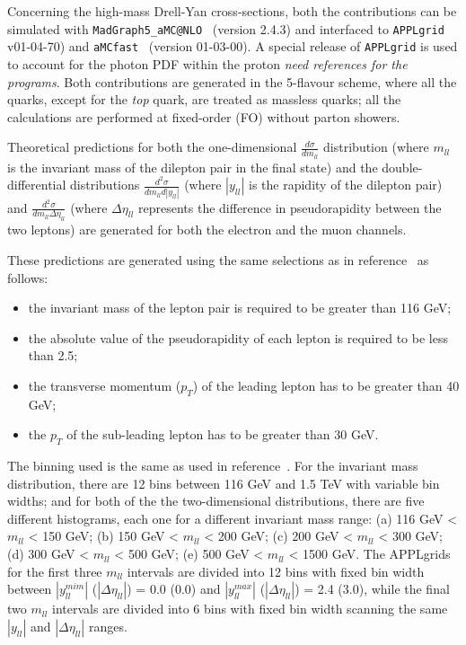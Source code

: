 Concerning the high-mass Drell-Yan cross-sections,
both the contributions can be 
simulated with {\tt MadGraph5{\_}aMC@NLO}~\cite{Alwall:2014hca}
(version 2.4.3) and interfaced to {\tt APPLgrid}~\cite{Carli:2010rw}
v01-04-70) and {\tt aMCfast}~\cite{Carli:2010rw} (version 01-03-00).
%
A special release of {\tt APPLgrid} is used to account for the photon PDF within the proton {\it need references for the programs}.
Both contributions are generated in the 5-flavour scheme, where all the quarks, except for the \textit{top}
 quark, are treated as massless quarks; all the calculations are performed at fixed-order (FO) without 
 parton showers.



Theoretical predictions for both the one-dimensional $\frac{d\sigma}{dm_{ll}}$ distribution 
(where $m_{ll}$ is the invariant mass of the dilepton pair in the final state) and the double-differential 
distributions $\frac{d^{2}\sigma}{dm_{ll}d|y_{ll}|}$ (where $|y_{ll}|$ is the rapidity of the dilepton pair) 
and $\frac{d^{2}\sigma}{dm_{ll}\Delta\eta_{ll}}$ (where $\Delta\eta_{ll}$ represents the difference in 
pseudorapidity between the two leptons) are generated for both the electron and the muon channels.
 
These predictions are generated using the same selections as in reference~\cite{jhep08-2016-009}
as follows:
\begin{itemize}
\item the invariant mass of the lepton pair is required to be greater than 116 GeV;
\item the absolute value of the pseudorapidity of each lepton is required to be less than 2.5;
\item the transverse momentum ($p_{T}$) of the leading lepton has to be greater than 40 GeV;
\item the $p_{T}$ of the sub-leading lepton has to be greater than 30 GeV.
\end{itemize} 
The binning used is the same as used in reference~\cite{jhep08-2016-009}. For the invariant mass 
distribution, there are 12 bins between 116 GeV and 1.5 TeV with variable bin widths; and for both of the 
 the two-dimensional distributions, there are five different histograms, each one for a different invariant
 mass range: (a) 116 GeV < $m_{ll}$ < 150 GeV; (b) 150 GeV < $m_{ll}$ < 200 GeV; (c) 200 GeV < $m_{ll}$ < 300 GeV; (d) 300 GeV < $m_{ll}$ < 500 GeV; (e) 500 GeV < $m_{ll}$ < 1500 GeV.
 The APPLgrids for the first three $m_{ll}$ intervals are divided into 12 bins with fixed bin 
width between $|y_{ll}^{mim}|$ ($|\Delta\eta_{ll}|$)  = 0.0 (0.0) and $|y_{ll}^{max}|$ ($|\Delta\eta_{ll}|$) = 2.4 (3.0), while the final two $m_{ll}$ intervals are divided into 6 bins with fixed bin width scanning the same $|y_{ll}|$ and $|\Delta\eta_{ll}|$ ranges.

